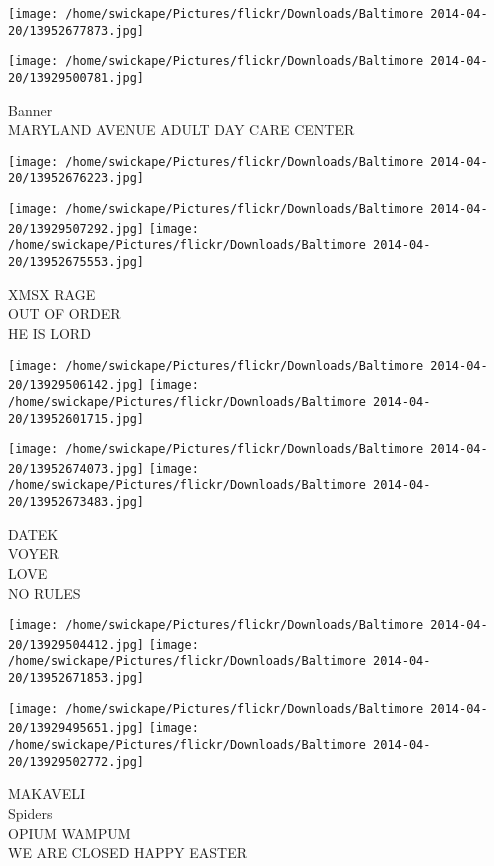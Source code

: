 \documentclass[10pt,letterpaper]{article}
\begin{document}
\texttt{[image: /home/swickape/Pictures/flickr/Downloads/Baltimore 2014-04-20/13952677873.jpg]}

\vspace{0.25in}
\texttt{[image: /home/swickape/Pictures/flickr/Downloads/Baltimore 2014-04-20/13929500781.jpg]}

Banner\\
MARYLAND AVENUE ADULT DAY CARE CENTER\\
\pagebreak

\texttt{[image: /home/swickape/Pictures/flickr/Downloads/Baltimore 2014-04-20/13952676223.jpg]}

\vspace{0.25in}
\texttt{[image: /home/swickape/Pictures/flickr/Downloads/Baltimore 2014-04-20/13929507292.jpg]}
\texttt{[image: /home/swickape/Pictures/flickr/Downloads/Baltimore 2014-04-20/13952675553.jpg]}

XMSX RAGE\\
OUT OF ORDER\\
HE IS LORD\\
\pagebreak

\texttt{[image: /home/swickape/Pictures/flickr/Downloads/Baltimore 2014-04-20/13929506142.jpg]}
\texttt{[image: /home/swickape/Pictures/flickr/Downloads/Baltimore 2014-04-20/13952601715.jpg]}

\texttt{[image: /home/swickape/Pictures/flickr/Downloads/Baltimore 2014-04-20/13952674073.jpg]}
\texttt{[image: /home/swickape/Pictures/flickr/Downloads/Baltimore 2014-04-20/13952673483.jpg]}

DATEK\\
VOYER\\
LOVE\\
NO RULES\\
\pagebreak

\texttt{[image: /home/swickape/Pictures/flickr/Downloads/Baltimore 2014-04-20/13929504412.jpg]}
\texttt{[image: /home/swickape/Pictures/flickr/Downloads/Baltimore 2014-04-20/13952671853.jpg]}

\texttt{[image: /home/swickape/Pictures/flickr/Downloads/Baltimore 2014-04-20/13929495651.jpg]}
\texttt{[image: /home/swickape/Pictures/flickr/Downloads/Baltimore 2014-04-20/13929502772.jpg]}

MAKAVELI\\
Spiders\\
OPIUM WAMPUM\\
WE ARE CLOSED HAPPY EASTER\\
\pagebreak
\end{document}
